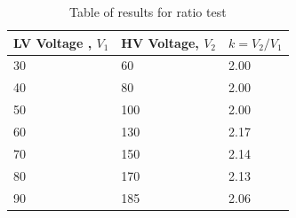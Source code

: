 \documentclass[12pt,a4paper]{report}
\begin{document}
\begin{table}[H]
    \centering
    \caption{Table of results for ratio test}
    \begin{tabular}{|l|l|l|}
    \hline
    LV Voltage , $V_{1}$ & HV Voltage, $V_{2}$ & $k=V_{2}/V_{1}$ \\ \hline
    30              & 60             & 2.00    \\ \hline
    40              & 80             & 2.00    \\ \hline
    50              & 100            & 2.00    \\ \hline
    60              & 130            & 2.17    \\ \hline
    70              & 150            & 2.14    \\ \hline
    80              & 170            & 2.13    \\ \hline
    90              & 185            & 2.06    \\ \hline
    \end{tabular}
    \end{table}
\end{document}
